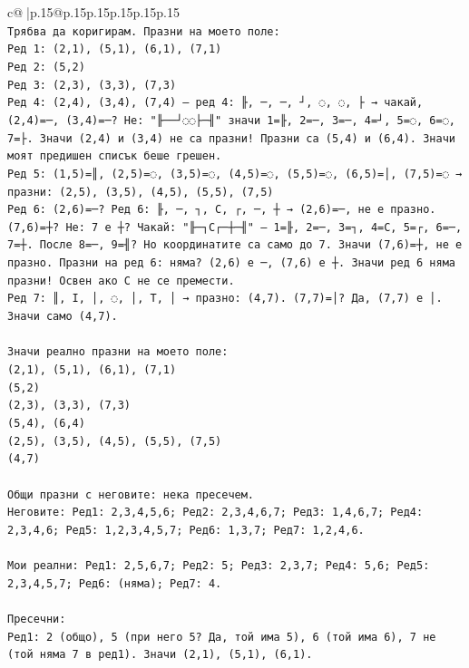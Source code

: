 \documentclass{article}
\begin{document}
{\begin{supertabular}{c@{$\;$}|p{.15\linewidth}@{}p{.15\linewidth}p{.15\linewidth}p{.15\linewidth}p{.15\linewidth}p{.15\linewidth}}
{{{\\ 
\texttt{Трябва да коригирам. Празни на моето поле:} \\
\texttt{Ред 1: (2,1), (5,1), (6,1), (7,1)} \\
\texttt{Ред 2: (5,2)} \\
\texttt{Ред 3: (2,3), (3,3), (7,3)} \\
\texttt{Ред 4: (2,4), (3,4), (7,4) — ред 4: ╟, ─, ─, ┘, ◌, ◌, ├ → чакай, (2,4)=─, (3,4)=─? Не: "╟──┘◌◌├─╢" значи 1=╟, 2=─, 3=─, 4=┘, 5=◌, 6=◌, 7=├. Значи (2,4) и (3,4) не са празни! Празни са (5,4) и (6,4). Значи моят предишен списък беше грешен.} \\
\texttt{Ред 5: (1,5)=║, (2,5)=◌, (3,5)=◌, (4,5)=◌, (5,5)=◌, (6,5)=│, (7,5)=◌ → празни: (2,5), (3,5), (4,5), (5,5), (7,5)} \\
\texttt{Ред 6: (2,6)=─? Ред 6: ╟, ─, ┐, C, ┌, ─, ┼ → (2,6)=─, не е празно. (7,6)=┼? Не: 7 е ┼? Чакай: "╟─┐C┌─┼─╢" — 1=╟, 2=─, 3=┐, 4=C, 5=┌, 6=─, 7=┼. После 8=─, 9=╢? Но координатите са само до 7. Значи (7,6)=┼, не е празно. Празни на ред 6: няма? (2,6) е ─, (7,6) е ┼. Значи ред 6 няма празни! Освен ако C не се премести.} \\
\texttt{Ред 7: ║, I, │, ◌, │, T, │ → празно: (4,7). (7,7)=│? Да, (7,7) е │. Значи само (4,7).} \\
\\ 
\texttt{Значи реално празни на моето поле:} \\
\texttt{(2,1), (5,1), (6,1), (7,1)} \\
\texttt{(5,2)} \\
\texttt{(2,3), (3,3), (7,3)} \\
\texttt{(5,4), (6,4)} \\
\texttt{(2,5), (3,5), (4,5), (5,5), (7,5)} \\
\texttt{(4,7)} \\
\\ 
\texttt{Общи празни с неговите: нека пресечем.} \\
\texttt{Неговите: Ред1: 2,3,4,5,6; Ред2: 2,3,4,6,7; Ред3: 1,4,6,7; Ред4: 2,3,4,6; Ред5: 1,2,3,4,5,7; Ред6: 1,3,7; Ред7: 1,2,4,6.} \\
\\ 
\texttt{Мои реални: Ред1: 2,5,6,7; Ред2: 5; Ред3: 2,3,7; Ред4: 5,6; Ред5: 2,3,4,5,7; Ред6: (няма); Ред7: 4.} \\
\\ 
\texttt{Пресечни:} \\
\texttt{Ред1: 2 (общо), 5 (при него 5? Да, той има 5), 6 (той има 6), 7 не (той няма 7 в ред1). Значи (2,1), (5,1), (6,1).} \\
}}}
\end{supertabular}}
\end{document}
